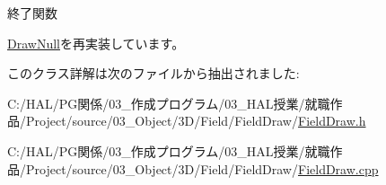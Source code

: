 終了関数 



\mbox{\hyperlink{class_draw_null_a12d44e341c7364b5ab9cdd661dc16187}{Draw\+Null}}を再実装しています。



このクラス詳解は次のファイルから抽出されました\+:\begin{DoxyCompactItemize}
\item 
C\+:/\+H\+A\+L/\+P\+G関係/03\+\_\+作成プログラム/03\+\_\+\+H\+A\+L授業/就職作品/\+Project/source/03\+\_\+\+Object/3\+D/\+Field/\+Field\+Draw/\mbox{\hyperlink{_field_draw_8h}{Field\+Draw.\+h}}\item 
C\+:/\+H\+A\+L/\+P\+G関係/03\+\_\+作成プログラム/03\+\_\+\+H\+A\+L授業/就職作品/\+Project/source/03\+\_\+\+Object/3\+D/\+Field/\+Field\+Draw/\mbox{\hyperlink{_field_draw_8cpp}{Field\+Draw.\+cpp}}\end{DoxyCompactItemize}
